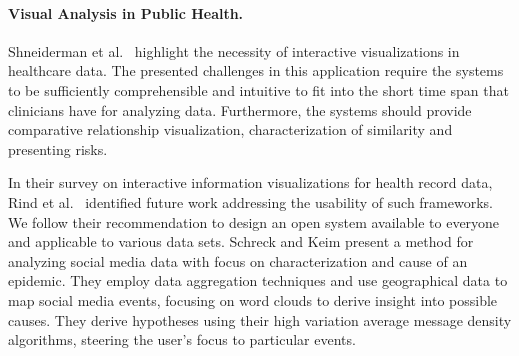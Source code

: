 \documentclass[journal]{style/vgtc} 			          %
\begin{document}
\paragraph{Visual Analysis in Public Health.}
Shneiderman et al.~\cite{Shneiderman2013} highlight the necessity of interactive visualizations in healthcare data. %
The presented challenges in this application require the systems to be sufficiently comprehensible and intuitive to fit into the short time span that clinicians have for analyzing data.
Furthermore, the systems should provide comparative relationship visualization, characterization of similarity and presenting risks.

In their survey on interactive information visualizations for health record data, Rind et al.~\cite{Rind} identified future work addressing the usability of such frameworks.
We follow their recommendation to design an open system available to everyone and applicable to various data sets.
Schreck and Keim \cite{Schreck} present a method for analyzing social media data with focus on characterization and cause of an epidemic.
They employ data aggregation techniques and use geographical data to map social media events, focusing on word clouds to derive insight into possible causes.
They derive hypotheses using their high variation average message density algorithms, steering the user's focus to particular events.
\end{document}
